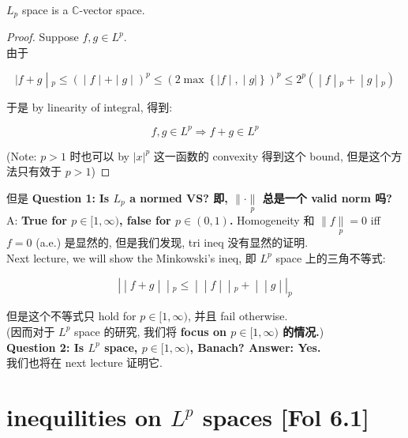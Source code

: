 \begin{lemma}{}

\(L_{p}\) space is a \(\mathbb{C}\)-vector space.

\end{lemma}

\begin{proof}

Suppose \(f,g \in L^{p}\).\\
由于

\[\left. |f + g \middle| {}_{p} \leq ( \middle| f \middle| + \middle| g \middle| )^{p} \leq (2\max\left\{ |f \middle| , \middle| g| \right\})^{p} \leq 2^{p}( \middle| f \middle| {}_{p} + \middle| g \middle| {}_{p}) \right.\]

于是 by linearity of integral, 得到:

\[f,g \in L^{p}\Longrightarrow f + g \in L^{p}\]

(Note: \(p > 1\) 时也可以 by \(|x|^{p}\) 这一函数的 convexity 得到这个 bound, 但是这个方法只有效于 \(p > 1\))

\end{proof}

但是 \textbf{Question 1:} \textbf{Is \(L_{p}\) a normed VS? 即, \(\parallel \cdot \underset{p}{\parallel}\) 总是一个 valid norm 吗?} A: \textbf{True for \(p \in \lbrack 1,\infty)\), false for \(p \in (0,1)\).} Homogeneity 和 \(\parallel f\underset{p}{\parallel} = 0\) iff \(f = 0\) (a.e.) 是显然的, 但是我们发现, tri ineq 没有显然的证明.\\
Next lecture, we will show the Minkowski's ineq, 即 \(L^{p}\) space 上的三角不等式:

\[\left. | \middle| f + g \middle| \middle| {}_{p} \leq \middle| \middle| f \middle| \middle| {}_{p} + \middle| \middle| g \middle| |_{p} \right.\]

但是这个不等式只 hold for \(p \in \lbrack 1,\infty)\), 并且 fail otherwise.\\
(因而对于 \(L^{p}\) space 的研究, 我们将 \textbf{focus on \(p \in \lbrack 1,\infty)\) 的情况.})\\
\textbf{Question 2: Is \(L^{p}\) space, \(p \in \lbrack 1,\infty)\), Banach? Answer: Yes.}\\
我们也将在 next lecture 证明它.

\section{\texorpdfstring{inequilities on \(L^{p}\) spaces {[}Fol 6.1{]}}{inequilities on L\^{}\{p\} spaces {[}Fol 6.1{]}}}

